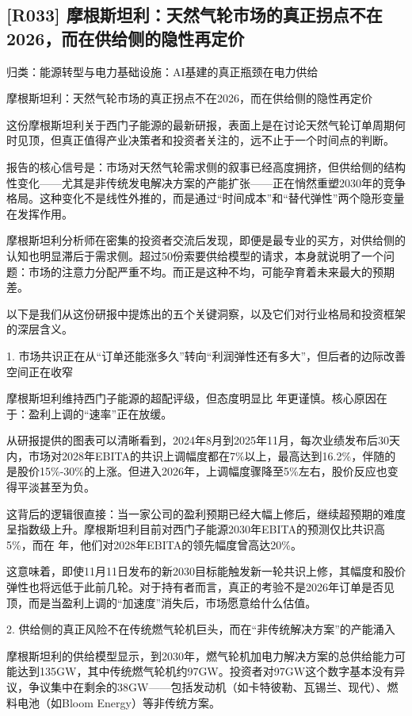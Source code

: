 \documentclass[11pt]{ctexart}
\begin{document}
\subsection{[R033] 摩根斯坦利：天然气轮市场的真正拐点不在2026，而在供给侧的隐性再定价}
{\small\color{refgray}归类：能源转型与电力基础设施：AI基建的真正瓶颈在电力供给}

摩根斯坦利：天然气轮市场的真正拐点不在2026，而在供给侧的隐性再定价

这份摩根斯坦利关于西门子能源的最新研报，表面上是在讨论天然气轮订单周期何时见顶，但真正值得产业决策者和投资者关注的，远不止于一个时间点的判断。

报告的核心信号是：市场对天然气轮需求侧的叙事已经高度拥挤，但供给侧的结构性变化——尤其是非传统发电解决方案的产能扩张——正在悄然重塑2030年的竞争格局。这种变化不是线性外推的，而是通过“时间成本”和“替代弹性”两个隐形变量在发挥作用。

摩根斯坦利分析师在密集的投资者交流后发现，即便是最专业的买方，对供给侧的认知也明显滞后于需求侧。超过50份索要供给模型的请求，本身就说明了一个问题：市场的注意力分配严重不均。而正是这种不均，可能孕育着未来最大的预期差。

以下是我们从这份研报中提炼出的五个关键洞察，以及它们对行业格局和投资框架的深层含义。

1. 市场共识正在从“订单还能涨多久”转向“利润弹性还有多大”，但后者的边际改善空间正在收窄

摩根斯坦利维持西门子能源的超配评级，但态度明显比 年更谨慎。核心原因在于：盈利上调的“速率”正在放缓。

从研报提供的图表可以清晰看到，2024年8月到2025年11月，每次业绩发布后30天内，市场对2028年EBITA的共识上调幅度都在7\%以上，最高达到16.2\%，伴随的是股价15\%-30\%的上涨。但进入2026年，上调幅度骤降至5\%左右，股价反应也变得平淡甚至为负。

这背后的逻辑很直接：当一家公司的盈利预期已经大幅上修后，继续超预期的难度呈指数级上升。摩根斯坦利目前对西门子能源2030年EBITA的预测仅比共识高5\%，而在 年，他们对2028年EBITA的领先幅度曾高达20\%。

这意味着，即使11月11日发布的新2030目标能触发新一轮共识上修，其幅度和股价弹性也将远低于此前几轮。对于持有者而言，真正的考验不是2026年订单是否见顶，而是当盈利上调的“加速度”消失后，市场愿意给什么估值。

2. 供给侧的真正风险不在传统燃气轮机巨头，而在“非传统解决方案”的产能涌入

摩根斯坦利的供给模型显示，到2030年，燃气轮机加电力解决方案的总供给能力可能达到135GW，其中传统燃气轮机约97GW。投资者对97GW这个数字基本没有异议，争议集中在剩余的38GW——包括发动机（如卡特彼勒、瓦锡兰、现代）、燃料电池（如Bloom Energy）等非传统方案。
\end{document}
